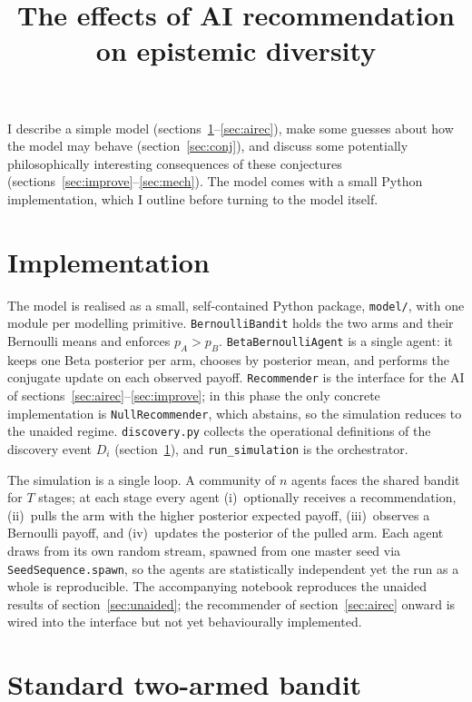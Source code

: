 \documentclass[12pt]{article}
\title{The effects of AI recommendation on epistemic diversity}
\author{}
\date{}
\begin{document}
\maketitle

I describe a simple model (sections~\ref{sec:bandit}--\ref{sec:airec}), make some guesses about how the model may behave (section~\ref{sec:conj}), and discuss some potentially philosophically interesting consequences of these conjectures (sections~\ref{sec:improve}--\ref{sec:mech}). The model comes with a small Python implementation, which I outline before turning to the model itself.

\section*{Implementation}

The model is realised as a small, self-contained Python package, \texttt{model/}, with one module per modelling primitive. \texttt{BernoulliBandit} holds the two arms and their Bernoulli means and enforces $p_A > p_B$. \texttt{BetaBernoulliAgent} is a single agent: it keeps one Beta posterior per arm, chooses by posterior mean, and performs the conjugate update on each observed payoff. \texttt{Recommender} is the interface for the AI of sections~\ref{sec:airec}--\ref{sec:improve}; in this phase the only concrete implementation is \texttt{NullRecommender}, which abstains, so the simulation reduces to the unaided regime. \texttt{discovery.py} collects the operational definitions of the discovery event $D_i$ (section~\ref{sec:bandit}), and \texttt{run\_simulation} is the orchestrator.

The simulation is a single loop. A community of $n$ agents faces the shared bandit for $T$ stages; at each stage every agent (i)~optionally receives a recommendation, (ii)~pulls the arm with the higher posterior expected payoff, (iii)~observes a Bernoulli payoff, and (iv)~updates the posterior of the pulled arm. Each agent draws from its own random stream, spawned from one master seed via \texttt{SeedSequence.spawn}, so the agents are statistically independent yet the run as a whole is reproducible. The accompanying notebook reproduces the unaided results of section~\ref{sec:unaided}; the recommender of section~\ref{sec:airec} onward is wired into the interface but not yet behaviourally implemented.

\section{Standard two-armed bandit}
\label{sec:bandit}
\end{document}
